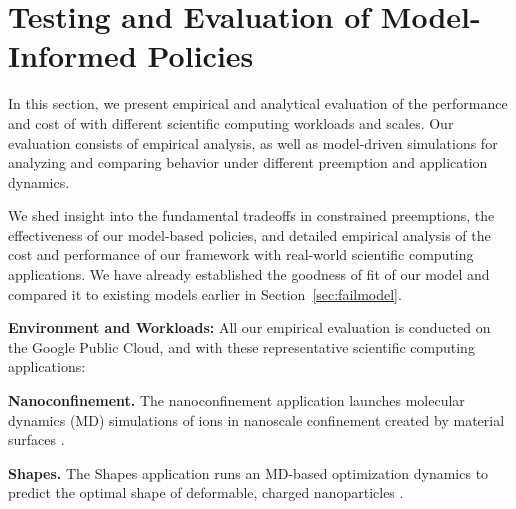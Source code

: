 \vspace*{\subsecspace}
\section{Testing and Evaluation of Model-Informed Policies}
\label{sec:eval}



In this section, we present empirical and analytical evaluation of the performance and cost of \sysname with different scientific computing workloads and scales. 
Our evaluation consists of empirical analysis, as well as model-driven simulations for analyzing and comparing \sysname behavior under different preemption and application dynamics.

We shed insight into the fundamental tradeoffs in constrained preemptions, the effectiveness of our model-based policies, and detailed empirical analysis of the cost and performance of our \sysname framework with real-world scientific computing applications. 
We have already established the goodness of fit of our model and compared it to existing models earlier in Section~\ref{sec:failmodel}. 


\noindent \textbf{Environment and Workloads:} All our empirical evaluation is conducted on the Google Public Cloud, and with these representative scientific computing applications: 

\noindent \textbf{Nanoconfinement.}
The nanoconfinement application launches molecular dynamics (MD) simulations of ions in nanoscale confinement created by material surfaces \cite{jyto,kadupitiya2017}.

\noindent \textbf{Shapes.} The Shapes application runs an MD-based optimization dynamics to predict the optimal shape of deformable, charged nanoparticles \cite{jto1,jjzo1}. 


